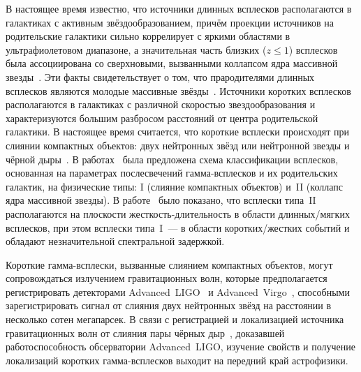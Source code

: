В настоящее время известно, что источники длинных всплесков располагаются в галактиках 
с активным звёздообразованием, причём проекции источников на родительские галактики сильно
коррелирует с яркими областями в ультрафиолетовом диапазоне, а значительная часть 
близких ($z \le 1$) всплесков была ассоциирована со сверхновыми, вызванными 
коллапсом ядра массивной звезды~\citep{Hjorth_and_Bloom_2012in_book}.
Эти факты свидетельствует о том, что прародителями длинных всплесков являются молодые 
массивные звёзды~\citep[см. обзор][]{Berger_2014ARAA}.
Источники коротких всплесков располагаются в галактиках с различной скоростью 
звездообразования и характеризуются большим разбросом расстояний от центра родительской галактики. 
В настоящее время считается, что короткие всплески происходят при слиянии компактных 
объектов: двух нейтронных звёзд или нейтронной звезды и чёрной дыры~\citep{Berger_2014ARAA}.
В работах~\citep{Zhang_2006, Zhang_2007, Zhang_2009} была предложена схема классификации всплесков, 
основанная на параметрах послесвечений гамма-всплесков и их родительских галактик,
на физические типы: I (слияние компактных объектов) и~II (коллапс ядра массивной звезды). 
В работе~\citep{Zhang_2009} было показано, 
что всплески типа~II располагаются на плоскости жесткость-длительность в области 
длинных/мягких всплесков, при этом всплески типа~I~--- в области коротких/жестких 
событий и обладают незначительной спектральной задержкой.

Короткие гамма-всплески, вызванные слиянием компактных объектов, могут сопровождаться 
излучением гравитационных волн, которые предполагается регистрировать 
детекторами Advanced~LIGO~\citep{LIGO_2015CQGra} и Advanced~Virgo~\citep{Acernese_2015CQGra}, 
способными зарегистрировать сигнал от слияния
двух нейтронных звёзд на расстоянии в несколько сотен мегапарсек. 
В связи с регистрацией и локализацией источника гравитационных
волн от слияния пары чёрных дыр~\citep{Abbott_2016PhRvL}, доказавшей работоспособность обсерватории 
Advanced~LIGO, изучение свойств и получение локализаций коротких гамма-всплесков 
выходит на передний край астрофизики.

